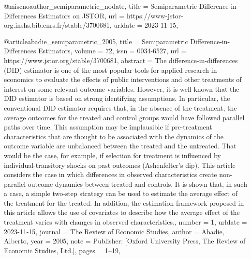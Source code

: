 {{@misc{noauthor_semiparametric_nodate,
	title = {Semiparametric {Difference}-in-{Differences} {Estimators} on {JSTOR}},
	url = {https://www-jstor-org.inshs.bib.cnrs.fr/stable/3700681},
	urldate = {2023-11-15},
}

@article{abadie_semiparametric_2005,
	title = {Semiparametric {Difference}-in-{Differences} {Estimators}},
	volume = {72},
	issn = {0034-6527},
	url = {https://www.jstor.org/stable/3700681},
	abstract = {The difference-in-differences (DID) estimator is one of the most popular tools for applied research in economics to evaluate the effects of public interventions and other treatments of interest on some relevant outcome variables. However, it is well known that the DID estimator is based on strong identifying assumptions. In particular, the conventional DID estimator requires that, in the absence of the treatment, the average outcomes for the treated and control groups would have followed parallel paths over time. This assumption may be implausible if pre-treatment characteristics that are thought to be associated with the dynamics of the outcome variable are unbalanced between the treated and the untreated. That would be the case, for example, if selection for treatment is influenced by individual-transitory shocks on past outcomes (Ashenfelter's dip). This article considers the case in which differences in observed characteristics create non-parallel outcome dynamics between treated and controls. It is shown that, in such a case, a simple two-step strategy can be used to estimate the average effect of the treatment for the treated. In addition, the estimation framework proposed in this article allows the use of covariates to describe how the average effect of the treatment varies with changes in observed characteristics.},
	number = {1},
	urldate = {2023-11-15},
	journal = {The Review of Economic Studies},
	author = {Abadie, Alberto},
	year = {2005},
	note = {Publisher: [Oxford University Press, The Review of Economic Studies, Ltd.]},
	pages = {1--19},
}

}}
